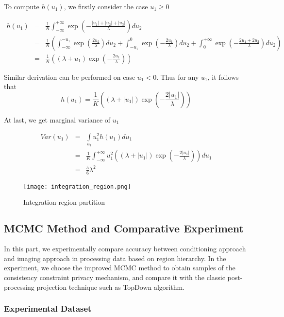 \documentclass[11pt]{article}
\begin{document}
To compute $h(u_1)$, we firstly consider the case $u_1\ge0$

\begin{eqnarray*}
    h(u_1)&=&\frac{1}{K}\int_{-\infty}^{+\infty} \exp \left(-\frac{|u_1|+|u_2|+|u_3|}{\lambda}\right) d u_2\\
     &=&\frac{1}{K}\left(\int_{-\infty}^{-u_1} \exp \left(\frac{2u_2}{\lambda}\right) d u_2 +\int_{-u_1}^{0} \exp\left(-\frac{2u_1}{\lambda}\right) d u_2 +\int_{0}^{+\infty} \exp\left(-\frac{2u_1+2u_2}{\lambda}\right) d u_2\right)\\
    &=&\frac{1}{K}\left(\left(\lambda+u_1\right)\exp\left(-\frac{2u_1}{\lambda}\right)\right)
\end{eqnarray*}

Similar derivation can be performed on case $u_1<0$. Thus for any $u_1$, it follows that $$h(u_1)=\frac{1}{K}\left(\left(\lambda+|u_1|\right)\exp\left(-\frac{2|u_1|}{\lambda}\right)\right)$$

At last, we get marginal variance of $u_1$

\begin{eqnarray*}
    Var(u_1)&=&\underset{u_1}{\int} u_1^2 h(u_1) d u_1\\
    &=&\frac{1}{K} \int_{-\infty}^{+\infty}u_1^2\left(\left(\lambda+|u_1|\right)\exp\left(-\frac{2|u_1|}{\lambda}\right)\right) d u_1\\
    &=&\frac{5}{6}{\lambda}^2
\end{eqnarray*}

\begin{figure*}[h]
 \centering
 \texttt{[image: integration\_region.png]}
 \caption{Integration region partition}
 \label{integration_region}
\end{figure*}


\subsection{MCMC Method and Comparative Experiment}

In this part, we experimentally compare accuracy  between conditioning approach and imaging approach in processing data based on region hierarchy. In the experiment, we choose the improved MCMC method to obtain samples of the consistency constraint privacy mechanism, and compare it with the classic post-processing projection technique such as TopDown algorithm.


\subsubsection{Experimental Dataset}
\end{document}
